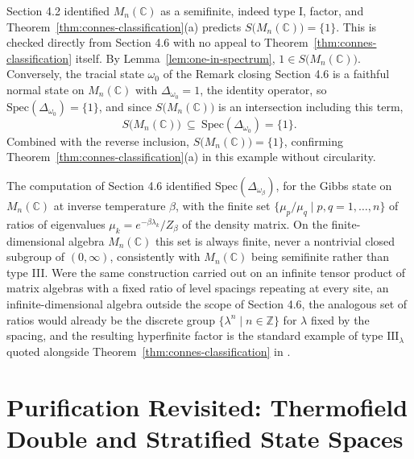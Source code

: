 \begin{remark}
	Section 4.2 identified $M_n(\mathbb{C})$ as a semifinite, indeed type I, factor, and Theorem~\ref{thm:connes-classification}(a) predicts $S\big(M_n(\mathbb{C})\big) = \{1\}$. This is checked directly from Section 4.6 with no appeal to Theorem~\ref{thm:connes-classification} itself. By Lemma~\ref{lem:one-in-spectrum}, $1 \in S\big(M_n(\mathbb{C})\big)$. Conversely, the tracial state $\omega_0$ of the Remark closing Section 4.6 is a faithful normal state on $M_n(\mathbb{C})$ with $\Delta_{\omega_0} = 1$, the identity operator, so $\mathrm{Spec}(\Delta_{\omega_0}) = \{1\}$, and since $S\big(M_n(\mathbb{C})\big)$ is an intersection including this term,
	\[
	S\big(M_n(\mathbb{C})\big) \ \subseteq \ \mathrm{Spec}(\Delta_{\omega_0}) = \{1\}.
	\]
	Combined with the reverse inclusion, $S\big(M_n(\mathbb{C})\big) = \{1\}$, confirming Theorem~\ref{thm:connes-classification}(a) in this example without circularity.
\end{remark}

\begin{remark}
	The computation of Section 4.6 identified $\mathrm{Spec}(\Delta_{\omega_\beta})$, for the Gibbs state on $M_n(\mathbb{C})$ at inverse temperature $\beta$, with the finite set $\{\mu_p/\mu_q \mid p,q=1,\dots,n\}$ of ratios of eigenvalues $\mu_k = e^{-\beta\lambda_k}/Z_\beta$ of the density matrix. On the finite-dimensional algebra $M_n(\mathbb{C})$ this set is always finite, never a nontrivial closed subgroup of $(0,\infty)$, consistently with $M_n(\mathbb{C})$ being semifinite rather than type III. Were the same construction carried out on an infinite tensor product of matrix algebras with a fixed ratio of level spacings repeating at every site, an infinite-dimensional algebra outside the scope of Section 4.6, the analogous set of ratios would already be the discrete group $\{\lambda^n \mid n \in \mathbb{Z}\}$ for $\lambda$ fixed by the spacing, and the resulting hyperfinite factor is the standard example of type $\mathrm{III}_\lambda$ quoted alongside Theorem~\ref{thm:connes-classification} in \cite[TODO: collocazione precisa]{TODO-Stratila}.
\end{remark}

\section{Purification Revisited: Thermofield Double and Stratified State Spaces}\label{sec:purification-revisited}

